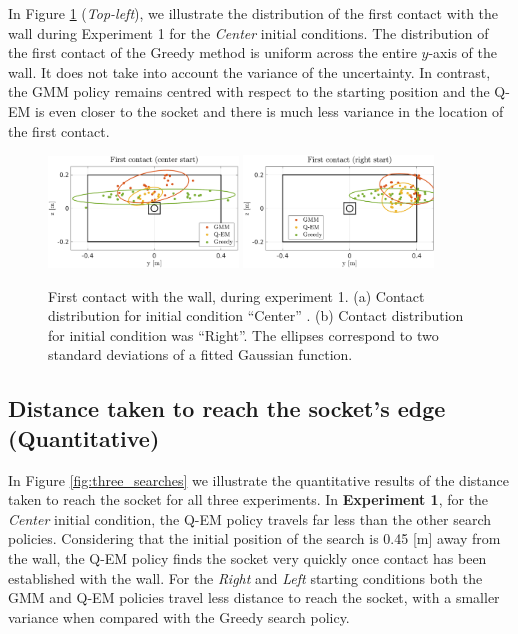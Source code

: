 In Figure \ref{fig:first_contact} (\textit{Top-left}), we illustrate the distribution of the first contact with the wall 
during Experiment 1 for the \textit{Center} initial conditions. The distribution of the first contact of the Greedy method is uniform across 
the entire $y$-axis of the wall. 
It does not take into account the variance of the uncertainty. In contrast, the GMM policy remains centred with respect to the starting position and the Q-EM is even closer to the socket and 
there is much less variance in the location of the first contact.

\begin{figure}
  \centering
   \includegraphics[width=0.45\textwidth]{./ch4-PiH/Figures/Fig/first_contact_center.pdf}
   \includegraphics[width=0.45\textwidth]{./ch4-PiH/Figures/Fig/first_contact_right.pdf}
   \caption{First contact with the wall, during experiment 1. (a) Contact distribution for initial condition ``Center'' . (b) 
   Contact distribution for initial condition was ``Right''. The ellipses correspond to two standard deviations of a fitted Gaussian 
   function.}
   \label{fig:first_contact}
\end{figure}

\subsection{Distance taken to reach the socket's edge (Quantitative)}

In Figure \ref{fig:three_searches} we illustrate the quantitative results of the distance taken 
to reach the socket for all three experiments. In \textbf{Experiment 1}, for the \textit{Center} initial condition,
the Q-EM policy travels far less than the other search policies. Considering that the initial position of the search is 
0.45 [m] away from the wall, the Q-EM policy finds the socket very quickly once contact has been established with the wall. 
For the \textit{Right} and \textit{Left} starting conditions both the GMM and Q-EM policies travel less distance to reach the socket, with a 
smaller variance when compared with the Greedy search policy.

